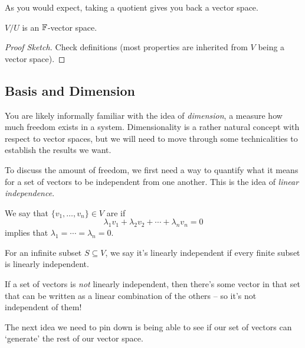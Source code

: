 \documentclass[a4paper]{scrartcl}
\begin{document}
As you would expect, taking a quotient gives you back a vector space.

\begin{proposition}
    $V/U$ is an $\mathbb{F}$-vector space.
\end{proposition}
\begin{proof}[Proof Sketch]
    Check definitions (most properties are inherited from $V$ being a vector space).
\end{proof}


\subsection{Basis and Dimension}

You are likely informally familiar with the idea of \emph{dimension}, a measure how much freedom exists in a system. Dimensionality is a rather natural concept with respect to vector spaces, but we will need to move through some technicalities to establish the results we want.

To discuss the amount of freedom, we first need a way to quantify what it means for a set of vectors to be independent from one another. This is the idea of \emph{linear independence}.


\begin{definition}
We say that $\{v_1, \dots, v_n\} \in V$ are  if
$$
\lambda_1 v_1 + \lambda_2 v_2 + \cdots + \lambda_n v_n = 0
$$
implies that $\lambda_1 = \cdots = \lambda_n = 0$.
\end{definition}

\begin{remark}
    For an infinite subset $S \subseteq V$, we say it's linearly independent if every finite subset is linearly independent.
\end{remark}

If a set of vectors is \emph{not} linearly independent, then there's some vector in that set that can be written as a linear combination of the others -- so it's not independent of them!

The next idea we need to pin down is being able to see if our set of vectors can `generate' the rest of our vector space. 
\end{document}
